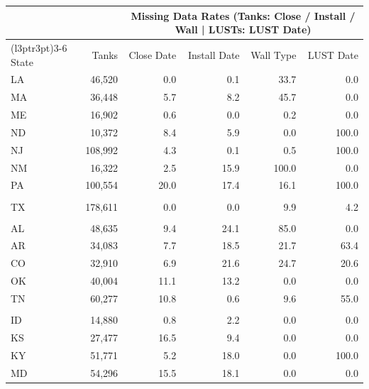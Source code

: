 \begin{table}
\centering\begingroup\fontsize{9}{11}\selectfont

\begin{tabular}[t]{lrrrrr}
\toprule
\multicolumn{2}{c}{ } & \multicolumn{4}{c}{Missing Data Rates (Tanks: Close / Install / Wall | LUSTs: LUST Date)} \\
\cmidrule(l{3pt}r{3pt}){3-6}
State & Tanks & Close Date & Install Date & Wall Type & LUST Date\\
\midrule
LA & 46,520 & 0.0 & 0.1 & 33.7 & 0.0\\
MA & 36,448 & 5.7 & 8.2 & 45.7 & 0.0\\
ME & 16,902 & 0.6 & 0.0 & 0.2 & 0.0\\
ND & 10,372 & 8.4 & 5.9 & 0.0 & 100.0\\
NJ & 108,992 & 4.3 & 0.1 & 0.5 & 100.0\\
NM & 16,322 & 2.5 & 15.9 & 100.0 & 0.0\\
PA & 100,554 & 20.0 & 17.4 & 16.1 & 100.0\\
\addlinespace[0.3em]
\multicolumn{6}{l}{\textbf{Target}}\\
\hspace{1em}TX & 178,611 & 0.0 & 0.0 & 9.9 & 4.2\\
\addlinespace[0.3em]
\multicolumn{6}{l}{\textbf{Control Tier 1}}\\
\hspace{1em}AL & 48,635 & 9.4 & 24.1 & 85.0 & 0.0\\
\hspace{1em}AR & 34,083 & 7.7 & 18.5 & 21.7 & 63.4\\
\hspace{1em}CO & 32,910 & 6.9 & 21.6 & 24.7 & 20.6\\
\hspace{1em}OK & 40,004 & 11.1 & 13.2 & 0.0 & 0.0\\
\hspace{1em}TN & 60,277 & 10.8 & 0.6 & 9.6 & 55.0\\
\addlinespace[0.3em]
\multicolumn{6}{l}{\textbf{Control Tier 2}}\\
\hspace{1em}ID & 14,880 & 0.8 & 2.2 & 0.0 & 0.0\\
\hspace{1em}KS & 27,477 & 16.5 & 9.4 & 0.0 & 0.0\\
\hspace{1em}KY & 51,771 & 5.2 & 18.0 & 0.0 & 100.0\\
\hspace{1em}MD & 54,296 & 15.5 & 18.1 & 0.0 & 0.0\\

\end{tabular}
\end{table}
